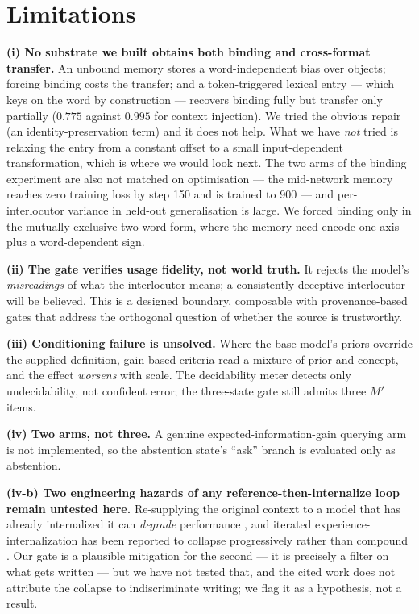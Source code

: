 \documentclass[11pt]{article}
\newcommand{\Mp}{\ensuremath{M'}}
\begin{document}
\section{Limitations}

\textbf{(i) No substrate we built obtains both binding and cross-format transfer.} An
unbound memory stores a word-independent bias over objects; forcing binding costs the
transfer; and a token-triggered lexical entry --- which keys on the word by construction ---
recovers binding fully but transfer only partially ($0.775$ against $0.995$ for context
injection). We tried the obvious repair (an identity-preservation term) and it does not help.
What we have \emph{not} tried is relaxing the entry from a constant offset to a small
input-dependent transformation, which is where we would look next.
The two arms of the binding experiment are also not matched on optimisation --- the
mid-network memory reaches zero training loss by step 150 and is trained to 900 --- and
per-interlocutor variance in held-out generalisation is large. We forced binding only in the
mutually-exclusive two-word form, where the memory need encode one axis plus a
word-dependent sign.

\textbf{(ii) The gate verifies usage fidelity, not world truth.} It rejects the model's
\emph{misreadings} of what the interlocutor means; a consistently deceptive interlocutor
will be believed. This is a designed boundary, composable with provenance-based gates that
address the orthogonal question of whether the source is trustworthy.

\textbf{(iii) Conditioning failure is unsolved.} Where the base model's priors override the
supplied definition, gain-based criteria read a mixture of prior and concept, and the effect
\emph{worsens} with scale. The decidability meter detects only undecidability, not confident
error; the three-state gate still admits three \Mp{} items.

\textbf{(iv) Two arms, not three.} A genuine expected-information-gain querying arm is not
implemented, so the abstention state's ``ask'' branch is evaluated only as abstention.

\textbf{(iv-b) Two engineering hazards of any reference-then-internalize loop remain
untested here.} Re-supplying the original context to a model that has already internalized
it can \emph{degrade} performance \citep{wang2026whencontext}, and iterated
experience-internalization has been reported to collapse progressively rather than compound
\citep{chen2026continual}. Our gate is a plausible mitigation for the second --- it is
precisely a filter on what gets written --- but we have not tested that, and the cited work
does not attribute the collapse to indiscriminate writing; we flag it as a hypothesis, not
a result.
\end{document}

